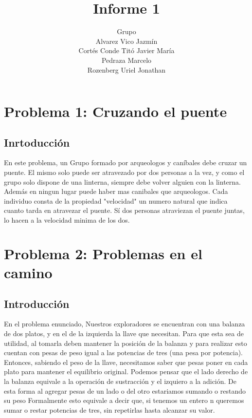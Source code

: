 \documentclass[spanish,12pt]{article}
\begin{document}
\title{Informe 1}

\author{Grupo  \\Alvarez Vico Jazm\'in\\Cortés Conde Titó Javier María\\Pedraza Marcelo \\ Rozenberg Uriel Jonathan}


\maketitle

\clearpage

\tableofcontents
\cleardoublepage

\section{Problema 1: Cruzando el puente}

\subsection{Inrtoducción}

En este problema, un Grupo formado por arqueologos y caníbales debe cruzar un puente. El mismo solo puede ser atravezado por dos personas a la vez, y como el grupo solo dispone de una linterna, siempre debe volver alguien con la linterna. Además en ningun lugar puede haber mas canibales que arqueologos.
Cada individuo consta de la propiedad "velocidad" un numero natural que indica cuanto tarda en atravezar el puente. Sí dos personas atraviezan el puente juntas, lo hacen a la velocidad minima de los dos.



\section{Problema 2: Problemas en el camino}

\subsection{Introducción}

En el problema enunciado, Nuestros exploradores se encuentran con una balanza de dos platos, y en el de la izquierda la llave que necesitan. Para que esta sea de utilidad, al tomarla deben mantener la posición de la balanza y para realizar esto cuentan con pesas de peso igual a las potencias de tres (una pesa por potencia).
Entonces, sabiendo el peso de la llave, necesitamos saber que pesas poner en cada plato para mantener el equilibrio original.
Podemos pensar que el lado derecho de la balanza equivale a la operación de sustracción y el izquiero a la adición. De esta forma al agregar pesas de un lado o del otro estariamos sumando o restando su peso
Formalmente esto equivale a decir que, si tenemos un entero n queremos sumar o restar potencias de tres, sin repetirlas hasta alcanzar su valor.
\end{document}
